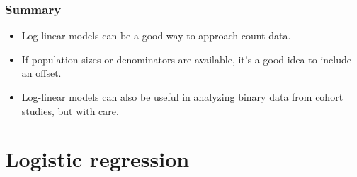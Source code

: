 \documentclass[10pt,xcolor={svgnames},t]{beamer}
\begin{document}
%
\begin{frame}
	\frametitle{Summary}
	
	\begin{itemize}
		\item Log-linear models can be a good way to approach count data.
		\bigskip
		\item If population sizes or denominators are available, it's a good idea to include an offset.
		\bigskip
		\item Log-linear models can also be useful in analyzing binary data from cohort studies, but with care.
	\end{itemize}
	
	
\end{frame}
%
\section{Logistic regression}
\end{document}
